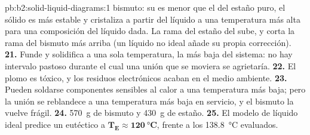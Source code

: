 \begin{solution}{pb:b2:solid-liquid-diagrams:1}
bismuto: su  es menor que el del estaño puro, el sólido es
más estable y cristaliza a partir del líquido a una temperatura más alta para una
composición del líquido dada. La rama del estaño del  sube, y corta la
rama del bismuto más arriba (un líquido no ideal añade su propia corrección).
\textbf{21.} Funde y solidifica a una sola temperatura, la más baja del sistema:
no hay intervalo pastoso durante el cual una unión que se moviera se agrietaría.
\textbf{22.} El plomo es tóxico, y los residuos electrónicos acaban en el medio ambiente.
\textbf{23.} Pueden soldarse componentes sensibles al calor a una temperatura más baja;
pero la unión se reblandece a una temperatura más baja en servicio, y el bismuto la vuelve
frágil.
\textbf{24.} \qty{570}{g} de bismuto y \qty{430}{g} de estaño.
\textbf{25.} El modelo de líquido ideal predice un eutéctico a $\boldsymbol{T_E
\approx \qty{120}{\degreeCelsius}}$, frente a los \qty{138.8}{\degreeCelsius}
evaluados.
\end{solution}
